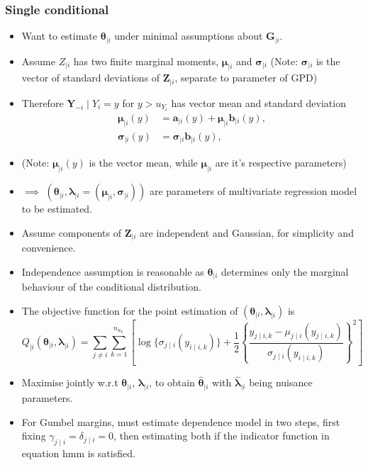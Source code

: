 \documentclass{article}
\numberwithin{equation}{section}
\begin{document}
\subsubsection{Single conditional}

\begin{itemize}
  \item Want to estimate $\bm{\theta}_{\mid i}$ under minimal assumptions about $\bm{G}_{\mid i}$. 
  \item Assume $Z_{\mid i}$ has two finite marginal moments, $\bm{\mu}_{\mid i}$ and $\bm{\sigma}_{\mid i}$ (Note: $\bm{\sigma}_{\mid i}$ is the vector of standard deviations of $\bm{Z}_{\mid i}$, separate to parameter of GPD) 
  \item Therefore $\bm{Y}_{-i} \mid Y_i = y$ for $y > u_{Y_i}$ has vector mean and standard deviation
    \begin{align*}
      \bm{\mu}_{\mid i}(y) &= \bm{a}_{\mid i}(y) + \bm{\mu}_{\mid i}{\bm{b}_{\mid i}}(y), \\
      \bm{\sigma}_{\mid i}(y) &= \bm{\sigma}_{\mid i}{\bm{b}_{\mid i}}(y),
    \end{align*}
  \item (Note: $\bm{\mu}_{\mid i}(y)$ is the vector mean, while $\bm{\mu}_{\mid i}$ are it's respective parameters)
  \item $\implies$ $(\bm{\theta}_{\mid i}, \bm{\lambda}_{\mid i} = (\bm{\mu}_{\mid i}, \bm{\sigma}_{\mid i}))$ are parameters of multivariate regression model to be estimated. 
  \item Assume components of $\bm{Z}_{\mid i}$ are independent and Gaussian, for simplicity and convenience. 
  \item Independence assumption is reasonable as $\bm{\theta}_{\mid i}$ determines only the marginal behaviour of the conditional distribution. 
  \item The objective function for the point estimation of $(\bm{\theta}_{\mid i}, \bm{\lambda}_{\mid i})$ is 
    \[
      Q_{\mid i}(\bm{\theta}_{\mid i}, \bm{\lambda}_{\mid i}) = \sum_{j \ne i}\sum_{k=1}^{n_{u_{Y_i}}}{\left[\log\{\sigma_{j \mid i}(y_{i\mid i, k})\} + \frac{1}{2} \left\{ \frac{y_{j\mid i, k} - \mu_{j\mid i}(y_{j\mid i, k})}{\sigma_{j \mid i}(y_{i\mid i, k})} \right\}^2 \right]}
    \]
  \item Maximise jointly w.r.t $\bm{\theta}_{\mid i}$, $\bm{\lambda}_{\mid i}$, to obtain $\hat{\bm{\theta}}_{\mid i}$ with $\hat{\bm{\lambda}}_{\mid i} $ being nuisance parameters.
  \item For Gumbel margins, must estimate dependence model in two steps, first fixing $\gamma_{j \mid i} = \delta_{j \mid i} = 0$, then estimating both if the indicator function in equation hmm is satisfied.
\end{itemize}
\end{document}
